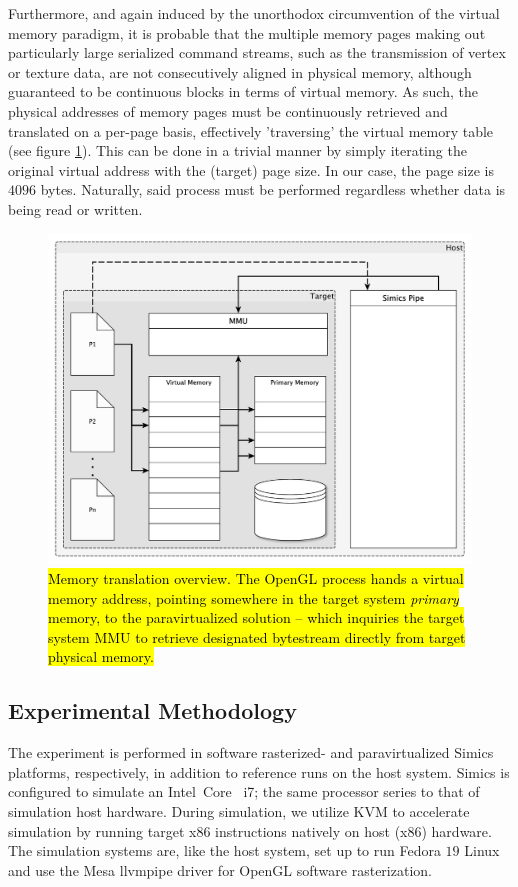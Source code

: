 Furthermore, and again induced by the unorthodox circumvention of the virtual memory paradigm, it is probable that the multiple memory pages making out particularly large serialized command streams, such as the transmission of vertex or texture data, are not consecutively aligned in physical memory, although guaranteed to be continuous blocks in terms of virtual memory.
As such, the physical addresses of memory pages must be continuously retrieved and translated on a per-page basis, effectively 'traversing' the virtual memory table (see figure \ref{fig:virtualmemory}).
This can be done in a trivial manner by simply iterating the original virtual address with the (target) page size. In our case, the page size is $4096$ bytes.
Naturally, said process must be performed regardless whether data is being read or written.

\begin{figure}
\centering
\includegraphics[width=\linewidth]{img/yedvirtualmemory.pdf}
\caption[Memory translation overview]{\hl{Memory translation overview. The OpenGL process hands a virtual memory address, pointing somewhere in the target system \textit{primary} memory, to the paravirtualized solution -- which inquiries the target system MMU to retrieve designated bytestream directly from target physical memory.}}
\label{fig:virtualmemory}
\end{figure}

\subsection{Experimental Methodology}
\label{sec:experimentalmethodology}
The experiment is performed in software rasterized- and paravirtualized Simics platforms, respectively, in addition to reference runs on the host system.
Simics is configured to simulate an Intel\circledR\ Core \texttrademark\ i7; the same processor series to that of simulation host hardware.
During simulation, we utilize KVM to accelerate simulation by running target x86 instructions natively on host (x86) hardware.
The simulation systems are, like the host system, set up to run Fedora $19$ Linux and use the Mesa llvmpipe driver for OpenGL software rasterization.

